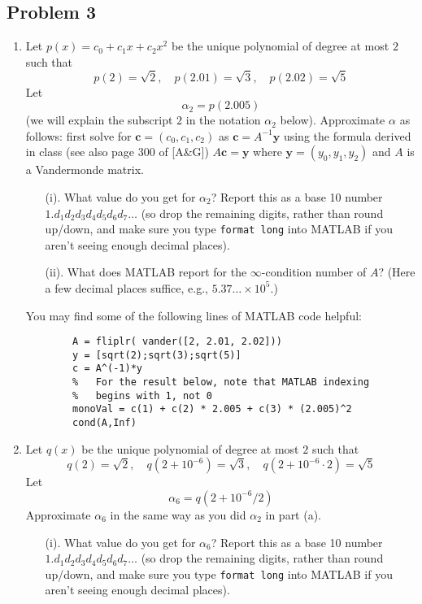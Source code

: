 \documentclass{article}
\begin{document}
\subsection*{Problem 3}
\begin{enumerate}
	\item Let $p(x) = c_0 + c_1x + c_2x^2$ be the unique polynomial
		of degree at most $2$ such that
		\[
			p(2) = \sqrt{2}, \quad p(2.01) = \sqrt{3},
			\quad p(2.02) = \sqrt{5}
		\]
		Let
		\[
			\alpha_2 = p(2.005)
		\]
		(we will explain the subscript $2$ in the notation $\alpha_2$ below).
		Approximate $\alpha$ as follows:
		first solve for $\mathbf{c} = (c_0,c_1,c_2)$ as $\mathbf{c} = A^{-1}\mathbf{y}$
		using the formula derived in class (see also page 300 of [A\&G])
		$A\mathbf{c} = \mathbf{y}$ where $\mathbf{y} = (y_0,y_1,y_2)$
		and $A$ is a Vandermonde matrix.
		\begin{enumerate}
			\item[(i).] What value do you get for $\alpha_2$?
				Report this as a base 10 number $1.d_1d_2d_3d_4d_5d_6d_7\dots$
				(so drop the remaining digits, rather than round up/down,
				and make sure you type \verb|format long| into MATLAB
				if you aren't seeing enough decimal places).
			\item[(ii).] What does MATLAB report for the $\infty$-condition number of $A$?
				(Here a few decimal places suffice, e.g., $5.37\dots\times 10^5$.)
		\end{enumerate}
		You may find some of the following lines of MATLAB code helpful:
		\begin{verbatim}
		A = fliplr( vander([2, 2.01, 2.02]))
		y = [sqrt(2);sqrt(3);sqrt(5)]
		c = A^(-1)*y
		%	For the result below, note that MATLAB indexing
		%	begins with 1, not 0
		monoVal = c(1) + c(2) * 2.005 + c(3) * (2.005)^2
		cond(A,Inf)
		\end{verbatim}
	\item Let $q(x)$ be the unique polynomial of degree at most $2$ such that
		\[
			q(2) = \sqrt{2}, \quad q(2 + 10^{-6}) = \sqrt{3},
			\quad q(2 + 10^{-6}\cdot2) = \sqrt{5}
		\]
		Let
		\[
			\alpha_6 = q(2 + 10^{-6}/2)
		\]
		Approximate $\alpha_6$ in the same way as you did $\alpha_2$ in part (a).
		\begin{enumerate}
			\item[(i).] What value do you get for $\alpha_6$?
				Report this as a base 10 number $1.d_1d_2d_3d_4d_5d_6d_7\dots$
				(so drop the remaining digits, rather than round up/down,
				and make sure you type \verb|format long| into MATLAB
				if you aren't seeing enough decimal places).

\end{enumerate}
\end{enumerate}
\end{document}
